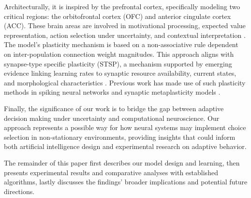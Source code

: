 Architecturally, it is inspired by the prefrontal cortex, specifically modeling two critical regions: the orbitofrontal cortex (OFC) and anterior cingulate cortex (ACC). These brain areas are involved in motivational processing, expected value representation, action selection under uncertainty, and contextual interpretation \cite{odohertyAbstractRewardPunishment2001, ricebergRewardStabilityDetermines2012, tremblayRelativeRewardPreference1999, elliottDissociableFunctionsMedial2000, frankAnatomyDecisionStriatoorbitofrontal2006}.
The model's plasticity mechanism is based on a non-associative rule dependent on inter-population connection weight magnitudes. This approach aligns with synapse-type specific plasticity (STSP), a mechanism supported by emerging evidence linking learning rates to synaptic resource availability,
current states, and morphological characteristics \cite{larsenSynapsetypespecificPlasticityLocal2015, blackmanTargetcellspecificShorttermPlasticity2013, bartolHippocampalSpineHead2015, arielIntrinsicVariabilityPv2012}. Previous work has made use of such plasticity methods in spiking neural networks and synaptic metaplasticity models \cite{inglisModulationDopamineAdaptive2021, iigayaAdaptiveLearningDecisionmaking2016}.

Finally, the significance of our work is to bridge the gap between adaptive decision making under uncertainty and computational neuroscience.
Our approach represents a possible way for how neural systems may implement choice selection in non-stationary environments, providing insights that could inform both artificial intelligence design and experimental research on adaptive behavior.

\hfill \break
The remainder of this paper first describes our model design and learning, then presents experimental results and comparative analyses with established algorithms, lastly discusses the findings' broader implications and potential future directions.

